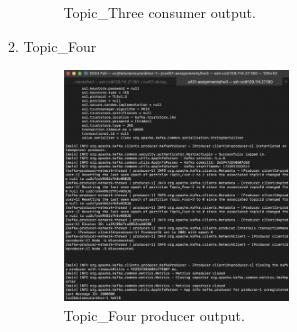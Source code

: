\documentclass{article}
\begin{document}
\begin{enumerate}
\begin{enumerate}
\begin{figure}[H]
\begin{minipage}{0.45\textwidth}
        \caption{Topic\_Three consumer output.}
      \end{minipage}
    \end{figure}
    \item Topic\_Four
    \begin{figure}[H]
      \centering
      \includegraphics[width=0.6\textwidth]{image16.png}
      \caption{Topic\_Four producer output.}
    \end{figure}


\end{enumerate}
\end{enumerate}
\end{document}
